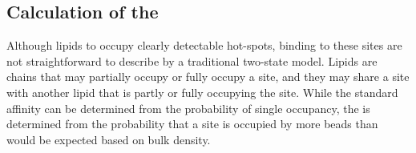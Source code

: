  \subsection{Calculation of the \newaffinity}
 
Although lipids to occupy clearly detectable hot-spots, binding to these sites are not straightforward to describe by a traditional two-state model. Lipids are chains that may partially occupy or fully occupy a site, and they may share a site with another lipid that is partly or fully occupying the site.  While the standard affinity can be determined from the probability of single occupancy, the \newaffinity{} is determined from the probability that a site is occupied by more beads than would be expected based on bulk density. %


